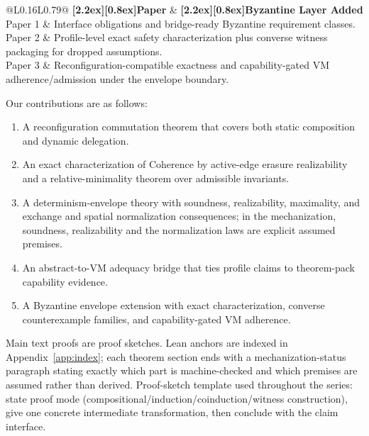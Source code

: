 \documentclass[a4paper,10pt,twocolumn,english]{article}
\numberwithin{equation}{section}
\theoremstyle{paperdef}
\theoremstyle{paperplain}
\theoremstyle{paperdef}
\theoremstyle{paperremark}
\theoremstyle{paperdef}
\newcommand{\thead}[1]{\textbf{\raisebox{0pt}[2.2ex][0.8ex]{#1}}}
\begin{document}
\begin{table}[H]
	\centering
	\scriptsize
	\begin{tabularx}{\columnwidth}{@{}L{0.16\columnwidth}L{0.79\columnwidth}@{}}
		\toprule
		\thead{Paper} & \thead{Byzantine Layer Added}                                                                                 \\
		\midrule
		Paper 1       & Interface obligations and bridge-ready Byzantine requirement classes.                                         \\
		Paper 2       & Profile-level exact safety characterization plus converse witness packaging for dropped assumptions.          \\
		Paper 3       & Reconfiguration-compatible exactness and capability-gated VM adherence/admission under the envelope boundary. \\
		\bottomrule
	\end{tabularx}
	\caption{Cross-paper Byzantine progression.}
	\label{tab:p3-byz-progression}
\end{table}

Our contributions are as follows:
\begin{enumerate}
	\item A reconfiguration commutation theorem that covers both static composition and dynamic delegation.
	\item An exact characterization of Coherence by active-edge erasure realizability and a relative-minimality theorem over admissible invariants.
	\item A determinism-envelope theory with soundness, realizability, maximality, and exchange and spatial normalization consequences; in the mechanization, soundness, realizability and the normalization laws are explicit assumed premises.
	\item An abstract-to-VM adequacy bridge that ties profile claims to theorem-pack capability evidence.
	\item A Byzantine envelope extension with exact characterization, converse counterexample families, and capability-gated VM adherence.
\end{enumerate}

Main text proofs are proof sketches. Lean anchors are indexed in Appendix~\ref{app:index}; each theorem section ends with a mechanization-status paragraph stating exactly which part is machine-checked and which premises are assumed rather than derived.
Proof-sketch template used throughout the series: state proof mode
(compositional/induction/coinduction/witness construction), give one concrete
intermediate transformation, then conclude with the claim interface.
\end{document}
